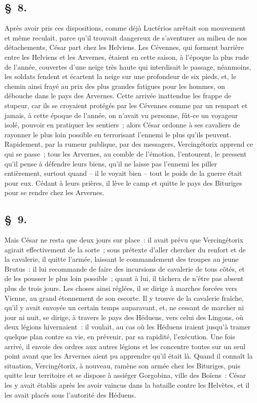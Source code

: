 \documentclass[french,twoside]{book} %
\begin{document}
\subsection[{§ 8.}]{ \textsc{§ 8.} }
\noindent Après avoir pris ces dispositions, comme déjà Luctérios arrêtait son mouvement et même reculait, parce qu’il trouvait dangereux de s’aventurer au milieu de nos détachements, César part chez les Helviens. Les Cévennes, qui forment barrière entre les Helviens et les Arvernes, étaient en cette saison, à l’époque la plus rude de l’année, couvertes d’une neige très haute qui interdisait le passage, néanmoins, les soldats fendent et écartent la neige sur une profondeur de six pieds, et, le chemin ainsi frayé au prix des plus grandes fatigues pour les hommes, on débouche dans le pays des Arvernes. Cette arrivée inattendue les frappe de stupeur, car ils se croyaient protégés par les Cévennes comme par un rempart et jamais, à cette époque de l’année, on n’avait vu personne, fût-ce un voyageur isolé, pouvoir en pratiquer les sentiers ; alors César ordonne à ses cavaliers de rayonner le plus loin possible en terrorisant l’ennemi le plus qu’ils peuvent. Rapidement, par la rumeur publique, par des messagers, Vercingétorix apprend ce qui se passe ; tous les Arvernes, au comble de l’émotion, l’entourent, le pressent qu’il pense à défendre leurs biens, qu’il ne laisse pas l’ennemi les piller entièrement, surtout quand – il le voyait bien – tout le poids de la guerre était pour eux. Cédant à leurs prières, il lève le camp et quitte le pays des Bituriges pour se rendre chez les Arvernes.
\subsection[{§ 9.}]{ \textsc{§ 9.} }
\noindent Mais César ne resta que deux jours sur place : il avait prévu que Vercingétorix agirait effectivement de la sorte ; sous prétexte d’aller chercher du renfort et de la cavalerie, il quitte l’armée, laissant le commandement des troupes au jeune Brutus : il lui recommande de faire des incursions de cavalerie de tous côtés, et de les pousser le plus loin possible ; quant à lui, il tâchera de n’être pas absent plus de trois jours. Les choses ainsi réglées, il se dirige à marches forcées vers Vienne, au grand étonnement de son escorte. Il y trouve de la cavalerie fraîche, qu’il y avait envoyée un certain temps auparavant, et, ne cessant de marcher ni jour ni nuit, se dirige, à travers le pays des Héduens, vers celui des Lingons, où deux légions hivernaient : il voulait, au cas où les Héduens iraient jusqu’à tramer quelque plan contre sa vie, en prévenir, par sa rapidité, l’exécution. Une fois arrivé, il envoie des ordres aux autres légions et les concentre toutes sur un seul point avant que les Arvernes aient pu apprendre qu’il était là. Quand il connaît la situation, Vercingétorix, à nouveau, ramène son armée chez les Bituriges, puis quitte leur territoire et se dispose à assiéger Gorgobina, ville des Boïens : César les y avait établis après les avoir vaincus dans la bataille contre les Helvètes, et il les avait placés sous l’autorité des Héduens.
\end{document}
